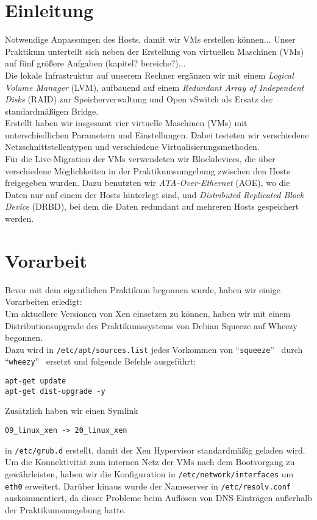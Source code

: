 

\chapter{Einleitung}
Notwendige Anpassungen des Hosts, damit wir VMs erstellen können...
Unser Praktikum unterteilt sich neben der Erstellung von virtuellen Maschinen (VMs) auf fünf größere Aufgaben (kapitel? bereiche?)... \\
Die lokale Infrastruktur auf unserem Rechner ergänzen wir mit einem \emph{Logical Volume Manager} (LVM), aufbauend auf einem \emph{Redundant Array of Independent Disks} (RAID) zur Speicherverwaltung und Open vSwitch als Ersatz der standardmäßigen Bridge. \\
Erstellt haben wir insgesamt vier virtuelle Maschinen (VMs) mit unterschiedlichen Parametern und Einstellungen. Dabei testeten wir verschiedene Netzschnittstellentypen und verschiedene Virtualisierungsmethoden. \\
Für die Live-Migration der VMs verwendeten wir Blockdevices, die über verschiedene Möglichkeiten in der Praktikumsumgebung zwischen den Hosts freigegeben wurden. Dazu benutzten wir \emph{ATA-Over-Ethernet} (AOE), wo die Daten nur auf einem der Hosts hinterlegt sind, und \emph{Distributed Replicated Block Device} (DRBD), bei dem die Daten redundant auf mehreren Hosts gespeichert werden. 
\chapter{Vorarbeit}
\label{chap:whezzy_ugprade}
Bevor mit dem eigentlichen Praktikum begonnen wurde, haben wir einige Vorarbeiten erledigt: \\ 
Um aktuellere Versionen von Xen einsetzen zu können, haben wir mit einem Distributionsupgrade des Praktikumssystems von Debian Squeeze auf Wheezy begonnen. \\ 
Dazu wird in \verb#/etc/apt/sources.list# jedes Vorkommen von \textquotedblleft\verb#squeeze#\textquotedblright ~ durch \textquotedblleft\verb#wheezy#\textquotedblright ~ ersetzt und folgende Befehle ausgeführt: 

\begin{verbatim}
apt-get update
apt-get dist-upgrade -y
\end{verbatim}
Zusätzlich haben wir einen Symlink 
\setupVerbatimOut 
\begin{verbatim} 
09_linux_xen -> 20_linux_xen 
\end{verbatim} 
in \verb#/etc/grub.d# erstellt, damit der Xen Hypervisor standardmäßig geladen wird.
\\
Um die Konnektivität zum internen Netz der VMs nach dem Bootvorgang zu gewährleisten, haben wir die Konfiguration in \verb#/etc/network/interfaces# um \verb#eth0# erweitert. Darüber hinaus wurde der Nameserver in \verb#/etc/resolv.conf# auskommentiert, da dieser Probleme beim Auflösen von DNS-Einträgen außerhalb der Praktikumsumgebung hatte.

